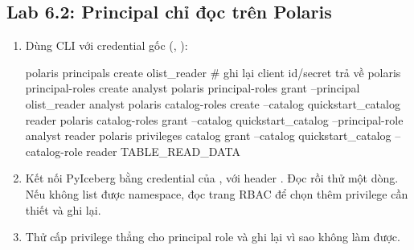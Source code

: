 \subsection{Lab 6.2: Principal chỉ đọc trên Polaris}
\begin{enumerate}
  \item Dùng CLI  với credential gốc (, ):
\begin{codeblock}
polaris principals create olist_reader          # ghi lại client id/secret trả về
polaris principal-roles create analyst
polaris principal-roles grant --principal olist_reader analyst
polaris catalog-roles create --catalog quickstart_catalog reader
polaris catalog-roles grant --catalog quickstart_catalog --principal-role analyst reader
polaris privileges catalog grant --catalog quickstart_catalog --catalog-role reader TABLE_READ_DATA
\end{codeblock}
  \item Kết nối PyIceberg bằng credential của , với header . Đọc  rồi thử  một dòng. Nếu không list được namespace, đọc trang RBAC để chọn thêm privilege cần thiết và ghi lại.
  \item Thử cấp privilege thẳng cho principal role và ghi lại vì sao không làm được.
\end{enumerate}

